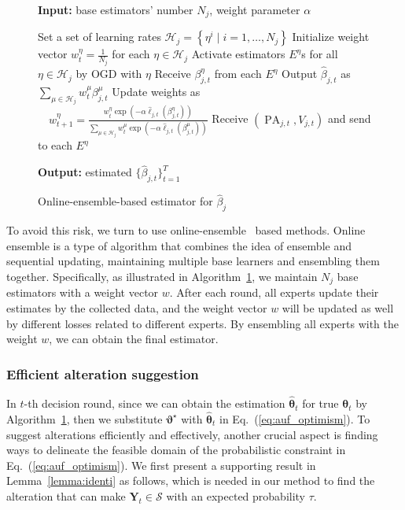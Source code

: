 \documentclass{article}
\theoremstyle{plain}
\theoremstyle{definition}
\theoremstyle{remark}
\def \Eq {Eq.}
\def \exp {\operatorname{exp}}
\def \sH {\mathcal{H}}
\def \sS {\mathcal{S}}
\def \Y {\mathbf{Y}}
\def \PA {\operatorname{PA}}
\begin{document}
\setlength{\intextsep}{1pt} 
\begin{figure}
  \begin{minipage}{\linewidth}
  \begin{algorithm}[H]
    \caption{Online-ensemble-based estimator for $\hat{\beta}_{j}$}
    \label{alg:online_ensemble}
    \textbf{Input:} base estimators' number $N_j$, weight parameter $\alpha$
  \begin{algorithmic}[1]
    \State Set a set of learning rates $\sH_j = \left\{\eta^i \mid i = 1,\ldots, N_j\right\}$
    \State Initialize weight vector $w_t^\eta = \frac{1}{N_j}$ for each $\eta\in\sH_j$ 
    \State Activate estimators $E^\eta$s for all $\eta\in\sH_j$ by OGD with $\eta$
      \State Receive $\beta_{j, t}^\eta$ from each $E^\eta$
      \State Output $\hat{\beta}_{j, t}$ as $ \sum_{\mu\in\sH_j} w_t^\mu \beta_{j, t}^\mu$
      \State Update weights as
      \State $\quad w^\eta_{t+1} = \frac{w^\eta_{t} \exp\left(-\alpha \hat{\ell}_{j, t}(\beta_{j,t}^\eta)\right)}{\sum_{\mu\in\sH_j} w_{t}^\mu \exp\left(-\alpha \hat{\ell}_{j, t}(\beta_{j, t}^\mu)\right)}$
      \State Receive $\left(\PA_{j, t}, V_{j, t}\right)$ and send to each $E^\eta$
    \EndFor
  \end{algorithmic}
  \textbf{Output:}  estimated $\{\hat{\beta}_{j, t}\}_{t=1}^T$
  \end{algorithm}
  \end{minipage}
  \end{figure}
To avoid this risk, we turn to use online-ensemble~\citep{zhao2024adaptivity} based methods. 
Online ensemble is a type of algorithm that combines the idea of ensemble and sequential updating, 
maintaining multiple base learners and ensembling them together.  
Specifically, as illustrated in Algorithm~\ref{alg:online_ensemble}, we maintain $N_j$ base estimators with a weight vector $w$. 
After each round, all experts update their estimates by the collected data, and the weight vector $w$ will be updated as well by different losses related to different experts.
By ensembling all experts with the weight $w$, we can obtain the final estimator. 

\subsubsection{Efficient alteration suggestion}
\label{sec:efficient}
In $t$-th decision round, since we can obtain the estimation $\hat{\bm{\theta}}_t$ for true $\bm{\theta}_t$ by Algorithm~\ref{alg:online_ensemble}, then we substitute $\bm{\vartheta}^\star$ with $\hat{\bm{\theta}}_t$ in \Eq~(\ref{eq:auf_optimism}). 
To suggest alterations efficiently and effectively, another crucial aspect is finding ways to delineate the feasible domain of the probabilistic constraint in \Eq~(\ref{eq:auf_optimism}). 
We first present a supporting result in Lemma~\ref{lemma:identi} as follows, which is needed in our method to find the alteration that can make $\Y_t\in\sS$ with an expected probability $\tau$. 
\end{document}
